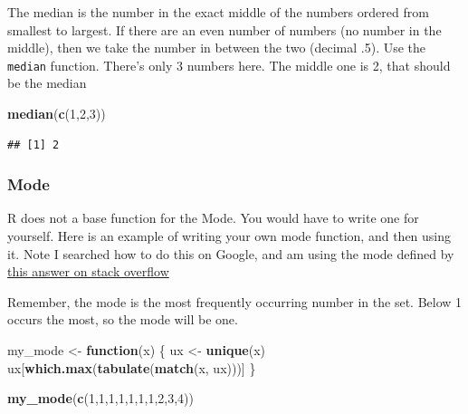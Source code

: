 \documentclass[
]{book}
\newenvironment{Shaded}{\begin{snugshade}}{\end{snugshade}}
\newcommand{\ControlFlowTok}[1]{\textcolor[rgb]{0.13,0.29,0.53}{\textbf{#1}}}
\newcommand{\DecValTok}[1]{\textcolor[rgb]{0.00,0.00,0.81}{#1}}
\newcommand{\FunctionTok}[1]{\textcolor[rgb]{0.13,0.29,0.53}{\textbf{#1}}}
\newcommand{\NormalTok}[1]{#1}
\newcommand{\OtherTok}[1]{\textcolor[rgb]{0.56,0.35,0.01}{#1}}
\begin{document}
The median is the number in the exact middle of the numbers ordered from smallest to largest. If there are an even number of numbers (no number in the middle), then we take the number in between the two (decimal .5). Use the \texttt{median} function. There's only 3 numbers here. The middle one is 2, that should be the median

\begin{Shaded}
\begin{Highlighting}[]
\FunctionTok{median}\NormalTok{(}\FunctionTok{c}\NormalTok{(}\DecValTok{1}\NormalTok{,}\DecValTok{2}\NormalTok{,}\DecValTok{3}\NormalTok{))}
\end{Highlighting}
\end{Shaded}

\begin{verbatim}
## [1] 2
\end{verbatim}

\hypertarget{mode}{%
\subsubsection{Mode}\label{mode}}

R does not a base function for the Mode. You would have to write one for yourself. Here is an example of writing your own mode function, and then using it. Note I searched how to do this on Google, and am using the mode defined by \href{https://stackoverflow.com/questions/2547402/is-there-a-built-in-function-for-finding-the-mode}{this answer on stack overflow}

Remember, the mode is the most frequently occurring number in the set. Below 1 occurs the most, so the mode will be one.

\begin{Shaded}
\begin{Highlighting}[]
\NormalTok{my\_mode }\OtherTok{\textless{}{-}} \ControlFlowTok{function}\NormalTok{(x) \{}
\NormalTok{  ux }\OtherTok{\textless{}{-}} \FunctionTok{unique}\NormalTok{(x)}
\NormalTok{  ux[}\FunctionTok{which.max}\NormalTok{(}\FunctionTok{tabulate}\NormalTok{(}\FunctionTok{match}\NormalTok{(x, ux)))]}
\NormalTok{\}}

\FunctionTok{my\_mode}\NormalTok{(}\FunctionTok{c}\NormalTok{(}\DecValTok{1}\NormalTok{,}\DecValTok{1}\NormalTok{,}\DecValTok{1}\NormalTok{,}\DecValTok{1}\NormalTok{,}\DecValTok{1}\NormalTok{,}\DecValTok{1}\NormalTok{,}\DecValTok{1}\NormalTok{,}\DecValTok{2}\NormalTok{,}\DecValTok{3}\NormalTok{,}\DecValTok{4}\NormalTok{))}
\end{Highlighting}
\end{Shaded}
\end{document}
